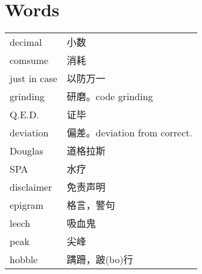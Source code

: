 \section{Words}

\begin{tabular}{ll}
decimal             & 小数        \\
comsume             & 消耗        \\         
just in case        & 以防万一      \\
grinding            & 研磨。code grinding \\
Q.E.D.              & 证毕          \\
deviation           & 偏差。deviation from correct. \\
Douglas             & 道格拉斯\\
SPA                 & 水疗\\
disclaimer          & 免责声明\\
epigram             & 格言，警句\\
leech               & 吸血鬼\\
peak                & 尖峰\\
hobble              & 蹒跚，跛(bo)行\\
\end{tabular}
